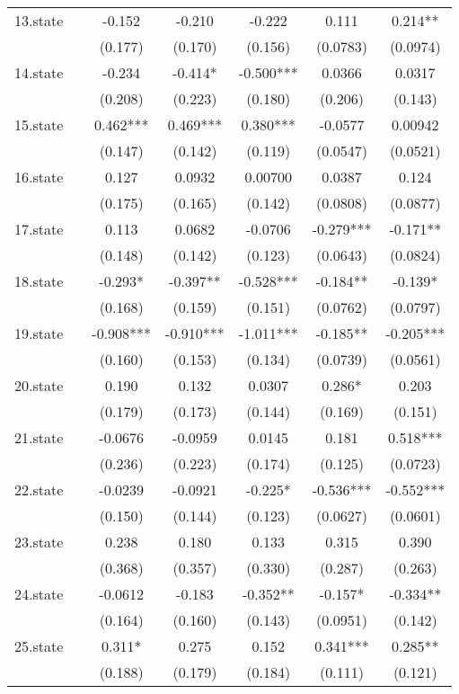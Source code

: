 \documentclass[]{article}
\begin{document}
\begin{tabular}{lcccccc}
13.state &  & -0.152 & -0.210 & -0.222 & 0.111 & 0.214** \\
 &  & (0.177) & (0.170) & (0.156) & (0.0783) & (0.0974) \\
14.state &  & -0.234 & -0.414* & -0.500*** & 0.0366 & 0.0317 \\
 &  & (0.208) & (0.223) & (0.180) & (0.206) & (0.143) \\
15.state &  & 0.462*** & 0.469*** & 0.380*** & -0.0577 & 0.00942 \\
 &  & (0.147) & (0.142) & (0.119) & (0.0547) & (0.0521) \\
16.state &  & 0.127 & 0.0932 & 0.00700 & 0.0387 & 0.124 \\
 &  & (0.175) & (0.165) & (0.142) & (0.0808) & (0.0877) \\
17.state &  & 0.113 & 0.0682 & -0.0706 & -0.279*** & -0.171** \\
 &  & (0.148) & (0.142) & (0.123) & (0.0643) & (0.0824) \\
18.state &  & -0.293* & -0.397** & -0.528*** & -0.184** & -0.139* \\
 &  & (0.168) & (0.159) & (0.151) & (0.0762) & (0.0797) \\
19.state &  & -0.908*** & -0.910*** & -1.011*** & -0.185** & -0.205*** \\
 &  & (0.160) & (0.153) & (0.134) & (0.0739) & (0.0561) \\
20.state &  & 0.190 & 0.132 & 0.0307 & 0.286* & 0.203 \\
 &  & (0.179) & (0.173) & (0.144) & (0.169) & (0.151) \\
21.state &  & -0.0676 & -0.0959 & 0.0145 & 0.181 & 0.518*** \\
 &  & (0.236) & (0.223) & (0.174) & (0.125) & (0.0723) \\
22.state &  & -0.0239 & -0.0921 & -0.225* & -0.536*** & -0.552*** \\
 &  & (0.150) & (0.144) & (0.123) & (0.0627) & (0.0601) \\
23.state &  & 0.238 & 0.180 & 0.133 & 0.315 & 0.390 \\
 &  & (0.368) & (0.357) & (0.330) & (0.287) & (0.263) \\
24.state &  & -0.0612 & -0.183 & -0.352** & -0.157* & -0.334** \\
 &  & (0.164) & (0.160) & (0.143) & (0.0951) & (0.142) \\
25.state &  & 0.311* & 0.275 & 0.152 & 0.341*** & 0.285** \\
 &  & (0.188) & (0.179) & (0.184) & (0.111) & (0.121) \\

\end{tabular}
\end{document}
